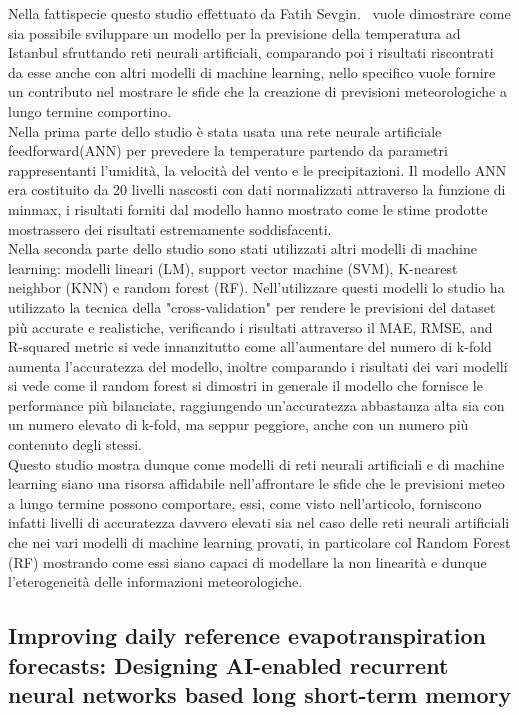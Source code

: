 Nella fattispecie questo studio effettuato da Fatih Sevgin.~\cite{sevgin2023temperature}  vuole dimostrare come sia possibile sviluppare un modello per la previsione della temperatura ad Istanbul sfruttando reti neurali artificiali, comparando poi i risultati riscontrati da esse anche con altri modelli di machine learning, nello specifico vuole fornire un contributo nel mostrare le sfide che la creazione di previsioni meteorologiche a lungo termine comportino.\\
Nella prima parte dello studio è stata usata una rete neurale artificiale feedforward(ANN) per prevedere la temperature partendo da parametri rappresentanti l'umidità, la velocità del vento e le precipitazioni. Il modello ANN era costituito da 20 livelli nascosti con dati normalizzati attraverso la funzione di minmax, i risultati forniti dal modello hanno mostrato come le stime prodotte mostrassero dei risultati estremamente soddisfacenti.\\
Nella seconda parte dello studio sono stati utilizzati altri modelli di machine learning: modelli lineari (LM), support vector machine (SVM), K-nearest neighbor (KNN) e random forest (RF). Nell'utilizzare questi modelli lo studio ha utilizzato la tecnica della "cross-validation" per rendere le previsioni del dataset più accurate e realistiche, verificando i risultati attraverso il MAE, RMSE, and R-squared metric si vede innanzitutto come all'aumentare del numero di k-fold aumenta l'accuratezza del modello, inoltre comparando i risultati dei vari modelli si vede come il random forest si dimostri in generale il modello che fornisce le performance più bilanciate, raggiungendo un'accuratezza abbastanza alta sia con un numero elevato di k-fold, ma seppur peggiore, anche con un numero più contenuto degli stessi.\\
Questo studio mostra dunque come modelli di reti neurali artificiali e di machine learning siano una risorsa affidabile nell'affrontare le sfide che le previsioni meteo a lungo termine possono comportare, essi, come visto nell'articolo, forniscono infatti livelli di accuratezza davvero elevati sia nel caso delle reti neurali artificiali che nei vari modelli di machine learning provati, in particolare col Random Forest (RF)  mostrando come essi siano capaci di modellare la non linearità e dunque l'eterogeneità delle informazioni meteorologiche.

\subsection{Improving daily reference evapotranspiration forecasts: Designing AI-enabled recurrent neural networks based long short-term memory}

